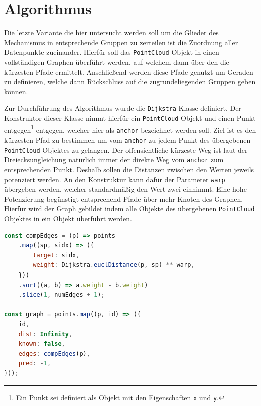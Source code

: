 \section{ Algorithmus}\label{ch:dijkstra}

Die letzte Variante die hier untersucht werden soll um die Glieder des Mechanismus in entsprechende Gruppen zu zerteilen ist die Zuordnung aller Datenpunkte zueinander.
Hierfür soll das \lstinline{PointCloud} Objekt in einen vollständigen Graphen überführt werden, auf welchem dann über den  die kürzesten Pfade ermittelt.
Anschlie{\ss}end werden diese Pfade genutzt um Geraden zu definieren, welche dann Rückschluss auf die zugrundeliegenden Gruppen geben können.

Zur Durchführung des  Algorithmus wurde die \lstinline{Dijkstra} Klasse definiert.
Der Konstruktor dieser Klasse nimmt hierfür ein \lstinline{PointCloud} Objekt und einen Punkt entgegen\footnote{Ein Punkt sei definiert als Objekt mit den Eigenschaften \lstinline{x} und \lstinline{y}.} entgegen, welcher hier als \lstinline{anchor} bezeichnet werden soll.
Ziel ist es den kürzesten Pfad zu bestimmen um vom \lstinline{anchor} zu jedem Punkt des übergebenen \lstinline{PointCloud} Objektes zu gelangen.
Der offensichtliche kürzeste Weg ist laut der Dreiecksungleichung natürlich immer der direkte Weg vom \lstinline{anchor} zum entsprechenden Punkt.
Deshalb sollen die Distanzen zwischen den Werten jeweils potenziert werden.
An den Konstruktur kann dafür der Parameter \lstinline{warp} übergeben werden, welcher standardmä{\ss}ig den Wert zwei einnimmt.
Eine hohe Potenzierung begünstigt entsprechend Pfade über mehr Knoten des Graphen.
Hierfür wird der Graph gebildet indem alle Objekte des übergebenen \lstinline{PointCloud} Objektes in ein Objekt überführt werden.

\begin{lstlisting}[language=JavaScript, caption={Im \lstinline{Dijkstra} Konstruktor werden die Punkte des übergebenen \lstinline{PointCloud} Objektes in einen Graphen überführt.}, label={lst:dijkstra_points_graph}]
const compEdges = (p) => points
    .map((sp, sidx) => ({
        target: sidx,
        weight: Dijkstra.euclDistance(p, sp) ** warp,
    }))
    .sort((a, b) => a.weight - b.weight)
    .slice(1, numEdges + 1);

const graph = points.map((p, id) => ({
    id,
    dist: Infinity,
    known: false,
    edges: compEdges(p),
    pred: -1,
}));
\end{lstlisting}


